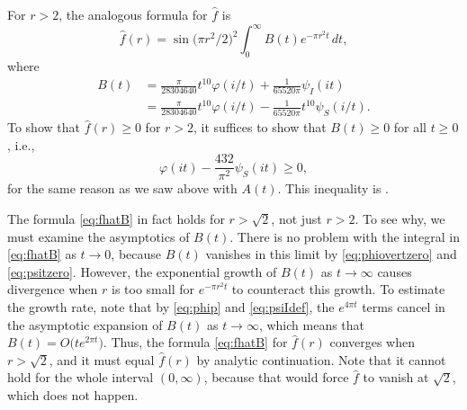 \documentclass{aomart}
\theoremstyle{plain}
\numberwithin{theorem}{section}
\numberwithin{equation}{section}
\begin{document}
For $r>2$, the analogous formula for $\widehat{f}$ is
\begin{equation} \label{eq:fhatB}
\widehat{f}(r) = \sin\mathopen{}\big(\pi r^2/2\big)^2\mathclose{} \int_0^\infty B(t) e^{-\pi r^2 t} \, dt,
\end{equation}
where
\begin{equation} \label{eq:Bdef}
\begin{split}
B(t) &= \frac{\pi}{28304640} t^{10} \varphi(i/t) + \frac{1}{65520\pi} \psi_I(it)\\
&= \frac{\pi}{28304640} t^{10} \varphi(i/t) - \frac{1}{65520\pi} t^{10}\psi_S(i/t).
\end{split}
\end{equation}
To show that $\widehat{f}(r) \ge 0$ for $r>2$, it suffices to show that $B(t)
\ge 0$ for all $t \ge 0$, i.e.,
\begin{equation} \label{eq:Bineq}
\varphi(it) - \frac{432}{\pi^2} \psi_S(it) \ge 0,
\end{equation}
for the same reason as we saw above with $A(t)$. This inequality is
.

The formula \eqref{eq:fhatB} in fact holds for $r > \sqrt{2}$, not just
$r>2$.  To see why, we must examine the asymptotics of $B(t)$.  There is no
problem with the integral in \eqref{eq:fhatB} as $t \to 0$, because $B(t)$
vanishes in this limit by \eqref{eq:phiovertzero} and \eqref{eq:psitzero}.
However, the exponential growth of $B(t)$ as $t \to \infty$ causes divergence
when $r$ is too small for $e^{-\pi r^2 t}$ to counteract this growth.  To
estimate the growth rate, note that by \eqref{eq:phip} and
\eqref{eq:psiIdef}, the $e^{4\pi t}$ terms cancel in the asymptotic expansion
of $B(t)$ as $t \to \infty$, which means that $B(t) = O\big(t e^{2\pi
t}\big)$. Thus, the formula \eqref{eq:fhatB} for $\widehat{f}(r)$ converges
when $r > \sqrt{2}$, and it must equal $\widehat{f}(r)$ by analytic
continuation. Note that it cannot hold for the whole interval $(0,\infty)$,
because that would force $\widehat{f}$ to vanish at $\sqrt{2}$, which does
not happen.
\end{document}

